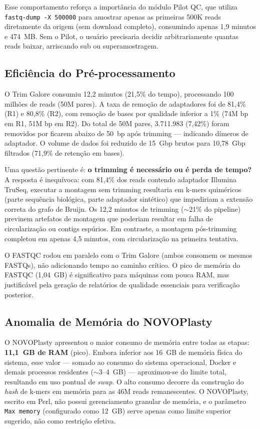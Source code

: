 Esse comportamento reforça a importância do módulo Pilot QC, que utiliza \texttt{fastq-dump\allowbreak{} -X\allowbreak{} 500000} para amostrar apenas as primeiras 500K reads diretamente da origem (sem download completo), consumindo apenas 1,9 minutos e 474~MB. Sem o Pilot, o usuário precisaria decidir arbitrariamente quantas reads baixar, arriscando sub ou superamostragem.

\subsection{Eficiência do Pré-processamento}

O Trim Galore consumiu 12,2 minutos (21,5\% do tempo), processando 100 milhões de reads (50M pares). A taxa de remoção de adaptadores foi de 81,4\% (R1) e 80,8\% (R2), com remoção de bases por qualidade inferior a 1\% (74M bp em R1, 51M bp em R2). Do total de 50M pares, 3.711.983 (7,42\%) foram removidos por ficarem abaixo de 50~bp após trimming --- indicando dímeros de adaptador. O volume de dados foi reduzido de 15~Gbp brutos para 10,78~Gbp filtrados (71,9\% de retenção em bases).

Uma questão pertinente é: \textbf{o trimming é necessário ou é perda de tempo?} A resposta é inequívoca: com 81,4\% dos reads contendo adaptador Illumina TruSeq, executar a montagem sem trimming resultaria em k-mers quiméricos (parte sequência biológica, parte adaptador sintético) que impediriam a extensão correta do grafo de Bruijn. Os 12,2 minutos de trimming ($\sim$21\% do pipeline) previnem artefatos de montagem que poderiam resultar em falha de circularização ou contigs espúrios. Em contraste, a montagem pós-trimming completou em apenas 4,5 minutos, com circularização na primeira tentativa.

O FASTQC rodou em paralelo com o Trim Galore (ambos consomem os mesmos FASTQs), não adicionando tempo ao caminho crítico. O pico de memória do FASTQC (1,04~GB) é significativo para máquinas com pouca RAM, mas justificável pela geração de relatórios de qualidade essenciais para verificação posterior.

\subsection{Anomalia de Memória do NOVOPlasty}

O NOVOPlasty apresentou o maior consumo de memória entre todas as etapas: \textbf{11,1~GB de RAM} (pico). Embora inferior aos 16~GB de memória física do sistema, esse valor --- somado ao consumo do sistema operacional, Docker e demais processos residentes ($\sim$3--4~GB) --- aproximou-se do limite total, resultando em uso pontual de \textit{swap}. O alto consumo decorre da construção do \textit{hash} de k-mers em memória para as 46M reads remanescentes. O NOVOPlasty, escrito em Perl, não possui gerenciamento granular de memória, e o parâmetro \texttt{Max memory} (configurado como 12~GB) serve apenas como limite superior sugerido, não como restrição efetiva.

